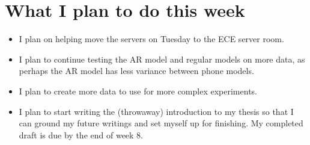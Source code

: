\documentclass[12pt]{article}%
\def\bi{\begin{itemize}     %
\vspace{-0.5em}\setlength\itemsep{0em}}
\begin{document}
\section{What I plan to do this week}
\bi
\item I plan on helping move the servers on Tuesday to the ECE server room.
\item I plan to continue testing the AR model and regular models on more data, as perhaps the AR model has less variance between phone models.
\item I plan to create more data to use for more complex experiments.
\item I plan to start writing the (throwaway) introduction to my thesis so that I can ground my future writings and set myself up for finishing. My completed draft is due by the end of week 8.
\end{itemize}

\end{document}
